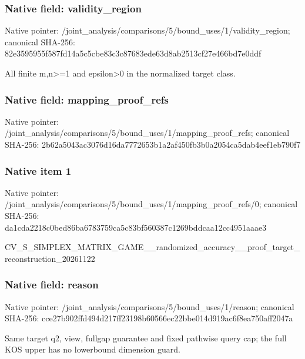\documentclass[10pt,a4paper]{article}
\begin{document}
\subsubsection{Native field: validity\_region}


Native pointer: /joint\_analysis/comparis\allowbreak{}ons/5/bound\_uses/1/valid\allowbreak{}ity\_region; canonical SHA-256: 82e3595955f587fd14a5c5cb\allowbreak{}e83c3c87683ede63d8ab2513\allowbreak{}cf27e466bd7e0ddf


All finite m,n>=1 and epsilon>0 in the normalized target class.


\subsubsection{Native field: mapping\_proof\_refs}


Native pointer: /joint\_analysis/comparis\allowbreak{}ons/5/bound\_uses/1/mappi\allowbreak{}ng\_proof\_refs; canonical SHA-256: 2b62a5043ac3076d16da7772\allowbreak{}653b1a2af450fb3b0a2054ca\allowbreak{}5dab4eef1eb790f7



\subsubsection{Native item 1}


Native pointer: /joint\_analysis/comparis\allowbreak{}ons/5/bound\_uses/1/mappi\allowbreak{}ng\_proof\_refs/0; canonical SHA-256: da1cda2218c0bed86ba67837\allowbreak{}59ca5c83bf560387c1269bdd\allowbreak{}caa12cc4951aaae3


CV\_S\_SIMPLEX\_MATRIX\_GAME\allowbreak{}\_\_randomized\_accuracy\_\_p\allowbreak{}roof\_target\_reconstructi\allowbreak{}on\_20261122


\subsubsection{Native field: reason}


Native pointer: /joint\_analysis/comparis\allowbreak{}ons/5/bound\_uses/1/reaso\allowbreak{}n; canonical SHA-256: cce27b902ffd494d217ff231\allowbreak{}98b60566ec22bbe014d919ac\allowbreak{}6f8ea750aff2047a


Same target q2, view, fullgap guarantee and fixed pathwise query cap; the full KOS upper has no lowerbound dimension guard.
\end{document}
